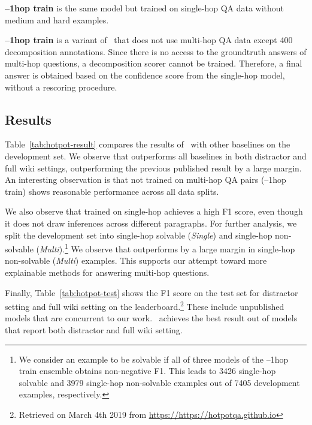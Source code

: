 \noindent \textbf{\bert--1hop train} is the same model but trained on single-hop QA data without \hotpot{} medium and hard examples.

\noindent \textbf{\sys--1hop train} is a variant of \sys\ that does not use multi-hop QA data except 400 decomposition annotations.
Since there is no access to the groundtruth answers of multi-hop questions, a decomposition scorer cannot be trained. Therefore, a final answer is obtained based on the confidence score from the single-hop \RC{} model, without a rescoring procedure.

\subsection{Results}

Table~\ref{tab:hotpot-result} compares the results of \sys\ with other baselines on the \hotpot{} development set.
We observe that \sys{} outperforms all baselines in both distractor and full wiki settings, outperforming the previous published result by a large margin. 
An interesting observation is that \sys{} not trained on multi-hop QA pairs (\sys--1hop train) shows reasonable performance across all data splits.

We also observe that \bert{} trained on single-hop \RC{} achieves a high F1 score, even though it does not draw inferences across different paragraphs.
For further analysis, we split the \hotpot{} development set into 
{single-hop solvable ({\em Single})} and {single-hop non-solvable ({\em Multi})}.\footnote{We consider an example to be solvable if all of three models of the \bert{}--1hop train ensemble obtains non-negative F1. This leads to 3426 single-hop solvable and 3979 single-hop non-solvable examples out of 7405 development examples, respectively.}
We observe that \sys{} outperforms \bert{} by a large margin in single-hop non-solvable ({\em Multi}) examples. This supports our attempt toward more explainable methods for answering multi-hop questions.


Finally, Table~\ref{tab:hotpot-test} shows the F1 score on the test set for distractor setting and full wiki setting on the leaderboard.\footnote{Retrieved on March 4th 2019 from \url{https://https://hotpotqa.github.io}}
These include unpublished models that are concurrent to our work. 
\sys\ achieves the best result out of models that report both distractor and full wiki setting.

